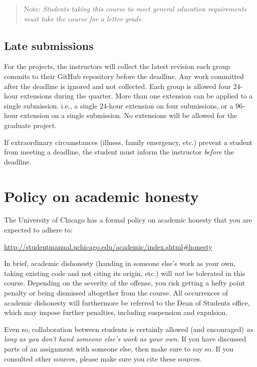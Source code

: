 \documentclass[11pt]{article}
\begin{document}
\begin{quote}
Note: \emph{Students taking this course to meet general education requirements must take the course for a letter grade}. 
\end{quote}


\subsection{Late submissions}

For the projects, the instructors will collect the latest revision each group commits to their GitHub repository before the deadline. Any work committed after the deadline is ignored and not collected. Each group is allowed four 24-hour extensions during the quarter. More than one extension can be applied to a single submission. i.e., a single 24-hour extension on four submissions, or a 96-hour extension on a single submission. No extensions will be allowed for the graduate project.

If extraordinary circumstances (illness, family emergency, etc.) prevent a student from meeting a deadline, the student must inform the instructor \emph{before} the deadline.


\section{Policy on academic honesty}

The University of Chicago has a formal policy on academic honesty that you are expected to adhere to:

\begin{center}
\url{http://studentmanual.uchicago.edu/academic/index.shtml#honesty}
\end{center}

In brief, academic dishonesty (handing in someone else's work as your own, taking existing code and not citing its origin, etc.) will \emph{not} be tolerated in this course. Depending on the severity of the offense, you risk getting a hefty point penalty or being dismissed altogether from the course. All occurrences of academic dishonesty will furthermore be referred to the Dean of Students office, which may impose further penalties, including suspension and expulsion.

Even so, collaboration between students is certainly allowed (and encouraged) \emph{as long as you don't hand someone else's work as your own}. If you have discussed parts of an assignment with someone else, then make sure to say so. If you consulted other sources, please make sure you cite these sources.
\end{document}
